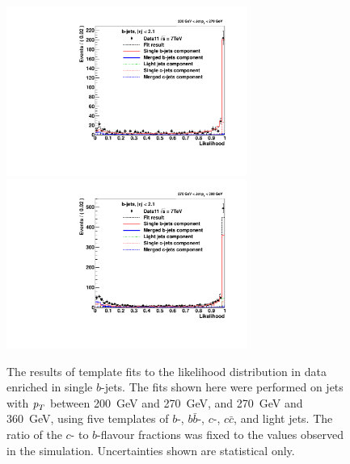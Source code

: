 \begin{figure}[tp]
\centering
\includegraphics[width=0.7\textwidth]{FIGS/Fits/LikelihoodFit_3param_ETAFull_DataEnriched2btag_Bin5.pdf}
\includegraphics[width=0.7\textwidth]{FIGS/Fits/LikelihoodFit_3param_ETAFull_DataEnriched2btag_Bin6.pdf}
\caption{The results of template fits to the likelihood distribution in data enriched in single $b$-jets. The fits shown here were performed on jets with ${\emph{p}_{T}}$ between  200~GeV and 270~GeV, and 270~GeV and 360~GeV, using five templates of $b$-, $b\bar{b}$-, $c$-, $c\bar{c}$, and light jets.  The ratio of the $c$- to $b$-flavour fractions was fixed to the values observed in the simulation.  Uncertainties shown are statistical only.}
\label{fig:fitenriched2btag2}
\end{figure}




